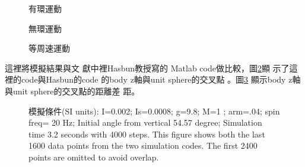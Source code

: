 \documentclass[12pt,twoside]{article}
\begin{document}
\begin{figure}[th]
\caption{有環運動}
\begin{center}
\end{center}
\end{figure}

\begin{figure}[th]
\caption{無環運動}
\begin{center}
\end{center}
\end{figure}

\begin{figure}[th]
\caption{等周速運動}
\label{figure_uniform}
\begin{center}
\end{center}
\end{figure}

這裡將模擬結果與文%
獻中\cite{hasbun}裡Hasbun教授寫的%
Matlab code做比較，圖\ref{compare}顯%
示了這裡的code與Hasbun的code%
的body z軸與unit sphere的交叉點%
。圖\ref{compare2} 顯示body z軸與unit
sphere的交叉點的距離差%
距。 
\begin{figure}[th]
\caption{{}模擬條件(SI units): I=0.002; Is=0.0008;
g=9.8; M=1 ; arm=.04; spin freq= 20 Hz; Initial angle from vertical 54.57
degree; Simulation time 3.2 seconds with 4000 steps. This figure shows both
the last 1600 data points from the two simulation codes. The first 2400
points are omitted to avoid overlap.}
\label{compare}
\begin{center}
\end{center}
\end{figure}
\begin{figure}[th]
\caption{{}}
\label{compare2}
\begin{center}
\end{center}
\end{figure}
\end{document}

